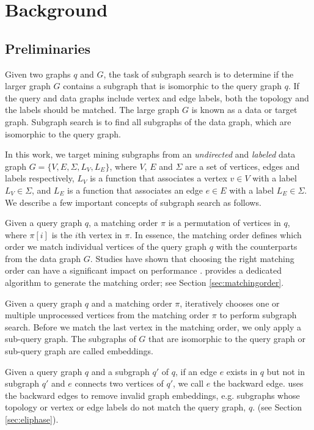 \section{Background}

\subsection{Preliminaries\label{sec:pre}}
Given two graphs $q$ and $G$, the task of subgraph search is to determine if the larger graph $G$ contains a subgraph that is isomorphic
to the query graph $q$. If the query and data graphs include vertex and edge labels, both the topology and the labels should be matched. The large graph $G$ is known as a data or target graph.  Subgraph search is to find all subgraphs  of the data graph, which are isomorphic to the query graph.

In this work, we target mining subgraphs from an \emph{undirected} and \emph{labeled} data graph $G=\{V,E,\Sigma,L_V,L_E\}$, where $V$, $E$
and $\Sigma$ are a set of vertices, edges and labels respectively,  $L_V$ is a function that associates a vertex $v \in V$ with a label
$L_V \in \Sigma$, and $L_E$ is a function that associates an edge $e \in E$ with a label $L_E \in \Sigma$. We describe a few important concepts of subgraph search as follows.

 Given a query graph $q$, a matching order $\pi$ is a permutation of vertices in $q$, where $\pi[i]$ is the
$i$th vertex in $\pi$. In essence, the matching order defines which order we match individual vertices of the query graph $q$ with the
counterparts from the data graph $G$. Studies have shown that choosing the right matching order can have a significant impact on
performance \cite{bi2016efficient,sun2020subgraph,sun2020rapidmatch,guo2020gpu}.  \SystemName provides a dedicated algorithm to generate
the matching order; see Section \ref {sec:matchingorder}.

 Given a query graph $q$ and a matching order $\pi$, \SystemName iteratively chooses  one or multiple
unprocessed vertices from the matching order $\pi$ to perform subgraph search. Before we match the last vertex in the matching order, we
only apply a sub-query graph. The subgraphs of $G$ that are isomorphic to the query graph or sub-query graph are called embeddings.

 Given a query graph $q$ and a subgraph $q'$ of $q$, if an edge $e$ exists in $q$ but not in subgraph $q'$ and
$e$ connects two vertices of $q'$, we call $e$ the backward edge. \SystemName uses the backward edges to remove invalid graph embeddings,
e.g. subgraphs whose topology or vertex or edge labels do not match the query graph, $q$.  (see Section \ref{sec:eliphase}).

